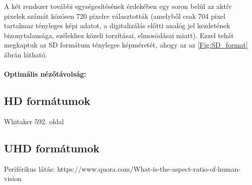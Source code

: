 A két rendszer további egységesítésének érdekében egy soron belül az aktív pixelek számát közösen 720 pixelre választották (amelyből csak 704 pixel tartalmaz tényleges képi adatot, a digitalizálás előtti analóg jel kezdetének bizonytalansága, szélekhez közeli torzításai, elmosódásai miatt).
Ezzel tehát megkaptuk az SD formátum tényleges képméretét, ahogy az az \ref{Fig:SD_format} ábrán látható.

\paragraph{Optimális nézőtávolság:\\}


\subsection{HD formátumok}

Whitaker 592. oldal

\subsection{UHD formátumok}

Periférikus látás:
https://www.quora.com/What-is-the-aspect-ratio-of-human-vision